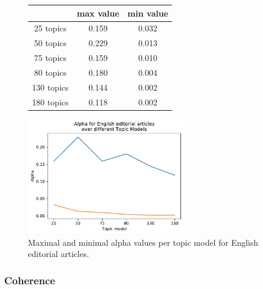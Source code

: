 \begin{figure}[h]
	\begin{minipage}{0.5\textwidth}
		\centering
		\begin{tabular}[t]{c|cc}
			&max value & min value\\
			\hline
			25 topics&0.159&0.032\\
			50 topics&0.229&0.013\\
			75 topics&0.159&0.010\\
			80 topics&	0.180&0.004\\
			130 topics &0.144&0.002\\
			180 topics&	0.118&0.002\\
		\end{tabular}
	\end{minipage}%
	\begin{minipage}{0.5\textwidth}
		\centering
		\includegraphics[width=7cm]{gfx/Eval_IC/English_Editorial_Alpha.pdf}
	\end{minipage}
	\caption{Maximal and minimal alpha values per topic model for English editorial articles.}
	\label{alpha_eng}
\end{figure}

\subsubsection{Coherence}

